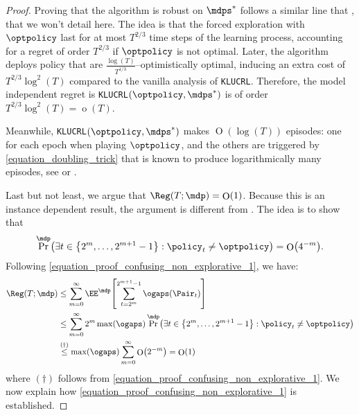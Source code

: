 \documentclass[preprint,cleveref,12pt]{colt2025}
\DeclarePairedDelimiter{\braces}{\{}{\}}	%
\DeclarePairedDelimiter{\brackets}{[}{]}	%
\DeclarePairedDelimiter{\parens}{(}{)}	%
\DeclareMathOperator*{\oh}{\mathrm{o}}
\DeclareMathOperator*{\OH}{\mathrm{O}}
\def\model{\mdp}
\def\models{\mdps}
\begin{document}
    \par
    \bigskip
    \def\proofname{Proof of \Cref{proposition_confusing_empty_robust}}
    \begin{proof}
        \def\proofname{Proof}
        Proving that the algorithm is robust on $\models^*$ follows a similar line that , that we won't detail here.
        The idea is that the forced exploration with $\optpolicy$ last for at most $T^{2/3}$ time steps of the learning process, accounting for a regret of order $T^{2/3}$ if $\optpolicy$ is not optimal. 
        Later, the algorithm deploys policy that are $\frac{\log(T)}{T^{1/3}}$--optimistically optimal, inducing an extra cost of $T^{2/3} \log^2(T)$ compared to the vanilla analysis of \texttt{KLUCRL}.
        Therefore, the model independent regret is \texttt{KLUCRL}$(\optpolicy, \models^*)$ is of order $T^{2/3} \log^2(T) = \oh(T)$. 

        Meanwhile, \texttt{KLUCRL}$(\optpolicy, \models^*)$ makes $\OH(\log(T))$ episodes: one for each epoch when playing $\optpolicy$, and the others are triggered by \eqref{equation_doubling_trick} that is known to produce logarithmically many episodes, see \cite{auer_near_optimal_2009} or .

        Last but not least, we argue that $\Reg(T; \model) = \OH(1)$.
        Because this is an instance dependent result, the argument is different from .
        The idea is to show that 
        \begin{equation}
        \label{equation_proof_confusing_non_explorative_1}
            \Pr^\model\parens[\big]{
                \exists t \in \braces*{2^m, \ldots, 2^{m+1}-1}
                :
                \policy_t \ne \optpolicy
            } = 
            \OH\parens*{4^{-m}}
            .
        \end{equation}
        Following \eqref{equation_proof_confusing_non_explorative_1}, we have:
        \begin{align*}
            \Reg(T; \model)
            & \le
            \sum_{m=0}^\infty
            \EE^{\model} \brackets*{
                \sum_{t=2^m}^{2^{m+1}-1}
                \ogaps(\Pair_t)
            }
            \\
            & \le 
            \sum_{m=0}^\infty
            2^m \max(\ogaps) \Pr^\model\parens[\big]{
                \exists t \in \braces*{2^m, \ldots, 2^{m+1}-1}
                :
                \policy_t \ne \optpolicy
            }
            \\
            & \overset{(\dagger)}\le
            \max(\ogaps) \sum_{m=0}^\infty \OH\parens*{2^{-m}}
            =
            \OH(1)
        \end{align*}
        where $(\dagger)$ follows from \eqref{equation_proof_confusing_non_explorative_1}.
        We now explain how \eqref{equation_proof_confusing_non_explorative_1} is established. 


\end{proof}
\end{document}
